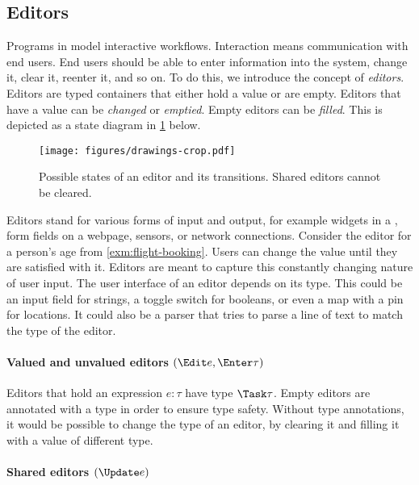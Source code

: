 \subsection{Editors}

Programs in \TOPHAT model interactive workflows.
Interaction means communication with end users.
End users should be able to enter information into the system, change it, clear it, reenter it, and so on.
To do this, we introduce the concept of \emph{editors}.
%
Editors are typed containers that either hold a value or are empty.
Editors that have a value can be \emph{changed} or \emph{emptied}.
Empty editors can be \emph{filled}.
This is depicted as a state diagram in \cref{fig:editor-state} below.

\begin{figure}[h]
  \centering
  \texttt{[image: figures/drawings-crop.pdf]}
  \caption{
    Possible states of an editor and its transitions.
    Shared editors cannot be cleared.
  }
  \label{fig:editor-state}
\end{figure}

Editors stand for various forms of input and output, for example widgets in a \GUI, form fields on a webpage, sensors, or network connections.
%
Consider the editor for a person's age from \cref{exm:flight-booking}.
Users can change the value until they are satisfied with it.
Editors are meant to capture this constantly changing nature of user input.
%
The user interface of an editor depends on its type.
This could be an input field for strings, a toggle switch for booleans, or even a map with a pin for locations.
It could also be a parser that tries to parse a line of text to match the type of the editor.


\paragraph{Valued and unvalued editors $(\Edit e, \Enter \tau)$}

Editors that hold an expression $e : \tau$ have type $\Task \tau$.
Empty editors are annotated with a type in order to ensure type safety.
Without type annotations, it would be possible to change the type of an editor, by clearing it and filling it with a value of different type.

\paragraph{Shared editors $(\Update e)$}

